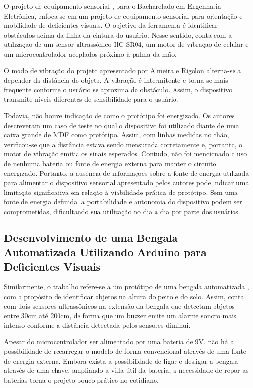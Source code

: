         O projeto de equipamento sensorial \cite{Rigolon}, para o Bacharelado em Engenharia Eletrônica, enfoca-se em um projeto de equipamento sensorial para orientação e mobilidade de deficientes visuais. O objetivo da ferramenta é identificar obstáculos acima da linha da cintura do usuário. Nesse sentido, conta com a utilização de um sensor ultrassônico HC-SR04, um motor de vibração de celular e um microcontrolador acoplados próximo à palma da mão.
    
        O modo de vibração do projeto apresentado por Almeira e Rigolon alterna-se a depender da distância do objeto. A vibração é intermitente e torna-se mais frequente conforme o usuário se aproxima do obstáculo. Assim, o dispositivo transmite níveis diferentes de sensibilidade para o usuário.
    
        Todavia, não houve indicação de como o protótipo foi energizado. Os autores descreveram um caso de teste no qual o dispositivo foi utilizado diante de uma caixa grande de MDF como protótipo. Assim, com linhas medidas no chão, verificou-se que a distância estava sendo mensurada corretamente e, portanto, o motor de vibração emitia os sinais esperados. Contudo, não foi mencionado o uso de nenhuma bateria ou fonte de energia externa para manter o circuito energizado. Portanto, a ausência de informações sobre a fonte de energia utilizada para alimentar o dispositivo sensorial apresentado pelos autores pode indicar uma limitação significativa em relação à viabilidade prática do protótipo. Sem uma fonte de energia definida, a portabilidade e autonomia do dispositivo podem ser comprometidas, dificultando sua utilização no dia a dia por parte dos usuários.
    
    \subsection{Desenvolvimento de uma Bengala Automatizada Utilizando Arduino para Deficientes Visuais}

        Similarmente, o trabalho refere-se a um protótipo de uma bengala automatizada \cite{BengalaAutomatizadaArduino}, com o propósito de identificar objetos na altura do peito e do solo. Assim, conta com dois sensores ultrassônicos na extensão da bengala que detectam objetos entre 30cm até 200cm, de forma que um buzzer emite um alarme sonoro mais intenso conforme a distância detectada pelos sensores diminui. 
    
        Apesar do microcontrolador ser alimentado por uma bateria de 9V, não há a possibilidade de recarregar o modelo de forma convencional através de uma fonte de energia externa. Embora exista a possibilidade de ligar e desligar a bengala através de uma chave, ampliando a vida útil da bateria, a necessidade de repor as baterias torna o projeto pouco prático no cotidiano.


